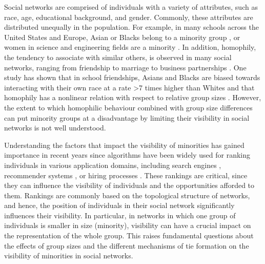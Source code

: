 \noindent 


\noindent Social networks are comprised of individuals with a variety of attributes, such as race, age, educational background, and gender. Commonly, these attributes are distributed unequally in the population. For example, in many schools across the United States and Europe, Asian or Blacks belong to a minority group \cite{moody2001race}, or women in science and engineering fields are a minority \cite{beede2011women}. In addition, homophily, the tendency to associate with similar others, is observed in many social networks, ranging from friendship to marriage to business partnerships \cite{mcpherson2001birds,moody2001race,baerveldt2004students,mislove2010you,fiore2005homophily}. One study has shown that in school friendships, Asians and Blacks are biased towards interacting with their own race at a rate >7 times higher than Whites and that homophily has a nonlinear relation with respect to relative group sizes \cite{currarini2010identifying}. %
However, the extent to which homophilic behaviour combined with group size differences can put minority groups at a disadvantage by limiting their visibility in social networks is not well understood.

Understanding the factors that impact the visibility of minorities has gained importance in recent years since algorithms have been widely used for ranking individuals in various application domains, including search engines \cite{brin1998anatomy,kleinberg1999hubs,horowitz2010anatomy}, recommender systems \cite{zhou2012state,king2010introduction}, or hiring processes \cite{boyd2014networked,miller2015can,chalfin2016productivity}. These rankings are critical, since they can influence the visibility of individuals and the opportunities afforded to them. Rankings are commonly based on the topological structure of networks, and hence, the position of individuals in their social network significantly influences their visibility. In particular, in networks in which one group of individuals is smaller in size (minority), visibility can have a crucial impact on the representation of the whole group. 
This raises fundamental questions about the effects of group sizes and the different mechanisms of tie formation on the visibility of minorities in social networks. 

